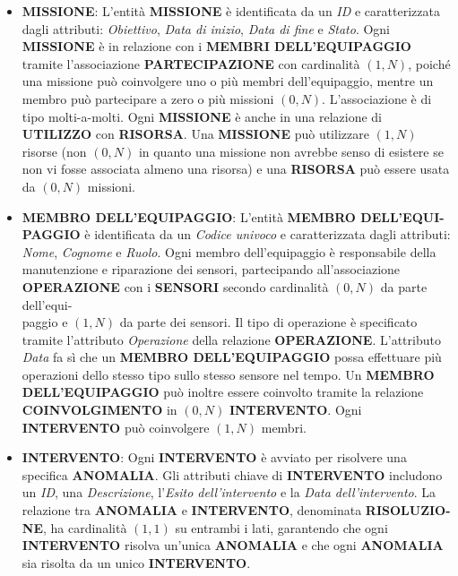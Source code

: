 \begin{itemize}
    \item \textbf{MISSIONE}: L'entità \textbf{MISSIONE} è identificata da un \textit{ID} e caratterizzata dagli attributi: \textit{Obiettivo}, \textit{Data di inizio}, \textit{Data di fine} e \textit{Stato}. Ogni \textbf{MISSIONE} è in relazione con i \textbf{MEMBRI DELL'EQUIPAGGIO} tramite l'associazione \textbf{PARTECIPAZIONE} con cardinalità $(1,N)$, poiché una missione può coinvolgere uno o più membri dell'equipaggio, mentre un membro può partecipare a zero o più missioni $(0,N)$. L'associazione è di tipo molti-a-molti. Ogni \textbf{MISSIONE} è anche in una relazione di \textbf{UTILIZZO} con \textbf{RISORSA}. Una \textbf{MISSIONE} può utilizzare $(1,N)$ risorse (non $(0,N)$ in quanto una missione non avrebbe senso di esistere se non vi fosse associata almeno una risorsa) e una \textbf{RISORSA} può essere usata da $(0,N)$ missioni.
    
    \item \textbf{MEMBRO DELL'EQUIPAGGIO}: L'entità \textbf{MEMBRO DELL'EQUI-\\PAGGIO} è identificata da un \textit{Codice univoco} e caratterizzata dagli attributi: \textit{Nome}, \textit{Cognome} e \textit{Ruolo}. Ogni membro dell'equipaggio è responsabile della manutenzione e riparazione dei sensori, partecipando all'associazione \textbf{OPERAZIONE} con i \textbf{SENSORI} secondo cardinalità $(0,N)$ da parte dell'equi-\\paggio e $(1,N)$ da parte dei sensori. Il tipo di operazione è specificato tramite l'attributo \textit{Operazione} della relazione \textbf{OPERAZIONE}. L'attributo \textit{Data} fa sì che un \textbf{MEMBRO DELL'EQUIPAGGIO} possa effettuare più operazioni dello stesso tipo sullo stesso sensore nel tempo. Un \textbf{MEMBRO DELL'EQUIPAGGIO} può inoltre essere coinvolto tramite la relazione \textbf{COINVOLGIMENTO} in $(0,N)$  \textbf{INTERVENTO}. Ogni \textbf{INTERVENTO} può coinvolgere $(1,N)$ membri.
    
    \item \textbf{INTERVENTO}: Ogni \textbf{INTERVENTO} è avviato per risolvere una specifica \textbf{ANOMALIA}. Gli attributi chiave di \textbf{INTERVENTO} includono un \textit{ID}, una \textit{Descrizione}, l'\textit{Esito dell'intervento} e la \textit{Data dell'intervento}. La relazione tra \textbf{ANOMALIA} e \textbf{INTERVENTO}, denominata \textbf{RISOLUZIO-\\NE}, ha cardinalità $(1,1)$ su entrambi i lati, garantendo che ogni \textbf{INTERVENTO} risolva un'unica \textbf{ANOMALIA} e che ogni \textbf{ANOMALIA} sia risolta da un unico \textbf{INTERVENTO}.
    

\end{itemize}
